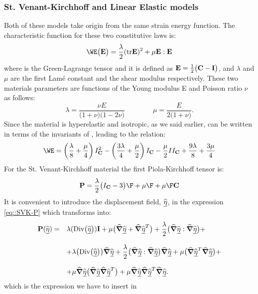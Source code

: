 \subsubsection{St. Venant-Kirchhoff and Linear Elastic models} Both of
these models take origin from the same strain energy function. The
characteristic function \W for these two constitutive laws is:
\begin{equation} \WE\big(\Et\big)=\frac{\lambda}{2}(\text{tr}\Et)^2 +
  \mu\Et:\Et
  \label{eq::W-SVKLE}
\end{equation} where \Et is the Green-Lagrange tensor and it is
defined as $\textbf{E}=\frac{1}{2}\big(\textbf{C}-\textbf{I}\big)$, and $\lambda$ and
$\mu$ are the first Lam\'e constant and the shear modulus
respectively. These two materials parameters are functions of the
Young modulus E and Poisson ratio $\nu$ as follows:
\begin{equation} \lambda=\frac{\nu E}{\big(1+\nu \big)\big(1-2\nu
    \big)}\qquad\qquad \mu=\frac{E}{2\big(1+\nu\big)}.
  \label{eq::LameConst}
\end{equation} Since the material is hyperelastic and isotropic, as we
said earlier, \W can be written in terms of the invariants of \C,
leading to the relation:
\begin{equation}
  \WE=\left(\frac{\lambda}{8}+\frac{\mu}{4}\right)I_{\C}^2 -
  \left(\frac{3\lambda}{4}+\frac{\mu}{2}\right)I_{\C} -
  \frac{\mu}{2}II_{\C}+\frac{9\lambda}{8}+\frac{3\mu}{4}
  \label{eq::WSVK-Inv}
\end{equation} For the St. Venant-Kirchhoff material the first
Piola-Kirchhoff tensor is:
\begin{equation} \Piola = \frac{\lambda}{2}\big(I_{\C}-3\big)\F +
  \mu\F +\mu\F\C
  \label{eq::SVK-P}
\end{equation} It is convenient to introduce the displacement field,
$\widehat{\underline{\eta}}$, in the expression \eqref{eq::SVK-P} which transforms into:
\begin{equation}
  \begin{array}{llll} \textbf{P}(\widehat{\underline{\eta}}) = & \displaystyle
    \lambda(\text{Div}\big(\widehat{\underline{\eta}}\big))\textbf{I} + \mu\big(\widehat{\boldsymbol{\nabla}}\widehat{\underline{\eta}} +
    \widehat{\boldsymbol{\nabla}}\widehat{\underline{\eta}}^T\big)
    +\frac{\lambda}{2}\big(\widehat{\boldsymbol{\nabla}}\widehat{\underline{\eta}}:\widehat{\boldsymbol{\nabla}}\widehat{\underline{\eta}}\big)+ \\ \\ &
    \displaystyle + \lambda\big(\text{Div}\big(\widehat{\underline{\eta}}\big)\big)\widehat{\boldsymbol{\nabla}}\widehat{\underline{\eta}} +
    \frac{\lambda}{2}\big(\widehat{\boldsymbol{\nabla}}\widehat{\underline{\eta}}:\widehat{\boldsymbol{\nabla}}\widehat{\underline{\eta}}\big)\widehat{\boldsymbol{\nabla}}\widehat{\underline{\eta}} +
    \mu\big(\widehat{\boldsymbol{\nabla}}\widehat{\underline{\eta}}^T \widehat{\boldsymbol{\nabla}}\widehat{\underline{\eta}}\big)+\\ \\ & \displaystyle +
    \mu\widehat{\boldsymbol{\nabla}}\widehat{\underline{\eta}}\big(\widehat{\boldsymbol{\nabla}}\widehat{\underline{\eta}}\widehat{\boldsymbol{\nabla}}\widehat{\underline{\eta}}^T\big) +
    \mu\widehat{\boldsymbol{\nabla}}\widehat{\underline{\eta}}\widehat{\boldsymbol{\nabla}}\widehat{\underline{\eta}}^T\widehat{\boldsymbol{\nabla}}\widehat{\underline{\eta}}.
  \end{array}
  \label{eq::SVK-P-displ}
\end{equation} which is the expression we have to insert in
